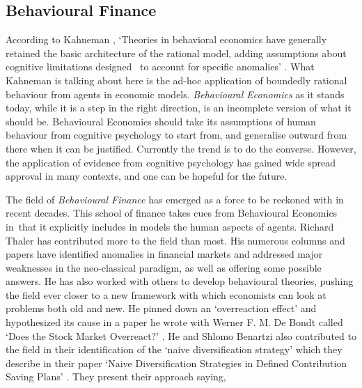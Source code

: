 \documentclass{ucthesis}
\begin{document}

\subsection{Behavioural Finance}

According to Kahneman \cite[2003]{Kahneman 2003}, `Theories in behavioral
economics have generally retained the basic architecture of the rational
model, adding assumptions about cognitive limitations designed \ to account
for specific anomalies' \cite[pp. 1469]{Kahneman 2003}. What Kahneman is
talking about here is the ad-hoc application of boundedly rational behaviour
from agents in economic models. \textit{Behavioural Economics} as it stands
today, while it is a step in the right direction, is an incomplete version
of what it should be. Behavioural Economics should take its assumptions of
human behaviour from cognitive psychology to start from, and generalise
outward from there when it can be justified. Currently the trend is to do
the converse. However, the application of evidence from cognitive psychology
has gained wide spread approval in many contexts, and one can be hopeful for
the future.

The field of \textit{Behavioural Finance} has emerged as a force to be
reckoned with in recent decades. This school of finance takes cues from
Behavioural Economics in\ that it explicitly includes in models the human
aspects of agents. Richard Thaler has contributed more to the field than
most. His numerous columns and papers have identified anomalies in financial
markets and addressed major weaknesses in the neo-classical paradigm, as
well as offering some possible answers. He has also worked with others to
develop behavioural theories, pushing the field ever closer to a new
framework with which economists can look at problems both old and new. He
pinned down an `overreaction effect' and hypothesized its cause in a paper
he wrote with Werner F. M. De Bondt called `Does the Stock Market
Overreact?' \cite[1985]{overreact}. He and Shlomo Benartzi also contributed
to the field in their identification of the `naive diversification strategy'
which they describe in their paper `Naive Diversification Strategies in
Defined Contribution Saving Plans' \cite[2001]{naive}. They present their
approach saying,
\end{document}
